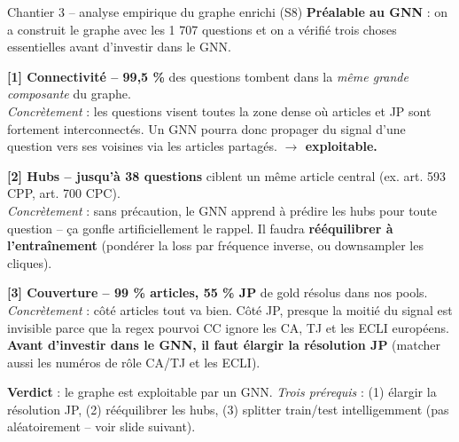 \documentclass[aspectratio=169,10pt]{beamer}
\newcommand{\okbox}[1]{%
  \begin{center}
  \colorbox{green!10}{\parbox{0.92\linewidth}{\centering #1}}
  \end{center}}
\begin{document}
\begin{frame}{Chantier 3 -- analyse empirique du graphe enrichi (S8)}
  \footnotesize
  \textbf{Préalable au GNN} : on a construit le graphe avec les 1 707 questions et
  on a vérifié trois choses essentielles avant d'investir dans le GNN.

  \vspace{0.5em}
  \textbf{\textcolor{ok}{[1] Connectivité -- 99,5 \%}} des questions tombent dans la
  \emph{même grande composante} du graphe.
  \\ \emph{Concrètement} : les questions visent toutes la zone dense où articles et JP
  sont fortement interconnectés. Un GNN pourra donc propager du signal d'une question
  vers ses voisines via les articles partagés. \textcolor{ok}{\textbf{$\to$ exploitable.}}

  \vspace{0.5em}
  \textbf{\textcolor{warn}{[2] Hubs -- jusqu'à 38 questions}} ciblent un même article
  central (ex. art. 593 CPP, art. 700 CPC).
  \\ \emph{Concrètement} : sans précaution, le GNN apprend à \og prédire les hubs pour
  toute question \fg{} -- ça gonfle artificiellement le rappel. Il faudra \textbf{rééquilibrer
  à l'entraînement} (pondérer la loss par fréquence inverse, ou downsampler les cliques).

  \vspace{0.5em}
  \textbf{\textcolor{warn}{[3] Couverture -- 99 \% articles, 55 \% JP}} de gold résolus dans nos pools.
  \\ \emph{Concrètement} : côté articles tout va bien. Côté JP, presque la moitié du signal
  est invisible parce que la regex pourvoi CC ignore les CA, TJ et les ECLI européens.
  \textbf{Avant d'investir dans le GNN, il faut élargir la résolution JP} (matcher aussi
  les numéros de rôle CA/TJ et les ECLI).

  \vspace{0.4em}
  \okbox{\textbf{Verdict} : le graphe est exploitable par un GNN. \emph{Trois prérequis} :
  (1) élargir la résolution JP, (2) rééquilibrer les hubs, (3) splitter train/test
  intelligemment (pas aléatoirement -- voir slide suivant).}
\end{frame}
\end{document}
